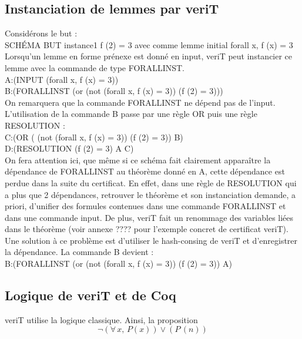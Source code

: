 \documentclass[11pt]{article}
\begin{document}
\subsection{Instanciation de lemmes par veriT}

Considérons le but : \\

SCHÉMA BUT instance1 f (2) = 3 avec comme lemme initial forall x, f (x) = 3 \\

Lorsqu'un lemme en forme prénexe est donné en input, veriT peut instancier ce lemme avec la commande de type FORALLINST. \\

A:(INPUT (forall x, f (x) = 3)) \\
B:(FORALLINST (or (not (forall x, f (x) = 3)) (f (2) = 3))) \\

On remarquera que la commande FORALLINST ne dépend pas de l'input. L'utilisation de la commande B passe par une règle OR puis une règle RESOLUTION : \\ 

C:(OR ( (not (forall x, f (x) = 3)) (f (2) = 3)) B) \\ 
D:(RESOLUTION (f (2) = 3) A C) \\ 



On fera attention ici, que même si ce schéma fait clairement apparaître la dépendance de FORALLINST au théorème donné en A, cette dépendance est perdue dans la suite du certificat. En effet, dans une règle de RESOLUTION qui a plus que 2 dépendances, retrouver le théorème et son instanciation demande, a priori, d'unifier des formules contenues dans une commande FORALLINST et dans une commande input. De plus, veriT fait un renommage des variables liées dans le théorème (voir annexe ???? pour l'exemple concret de certificat veriT). Une solution à ce problème est d'utiliser le hash-consing de veriT et d'enregistrer la dépendance. La commande B devient : \\

B:(FORALLINST (or (not (forall x, f (x) = 3)) (f (2) = 3)) A) 

\subsection{Logique de veriT et de Coq}
veriT utilise la logique classique. Ainsi, la proposition 
\[  \neg (\forall \, x, \, P(x)) \vee (P \, (n)) \]
\end{document}
